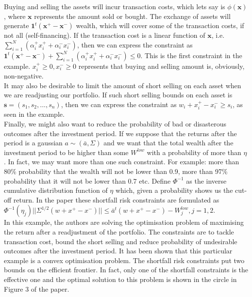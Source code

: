 \documentclass[11pt]{article}
\begin{document}
Buying and selling the assets will incur transaction costs, which lets say is $\phi(\bm{x})$, where $\bm{x}$ represents the amount sold or 
bought. The exchange of assets will generate $\bm{1}^t(\bm{x^+} - \bm{x^-})$ wealth, which will cover some of the transaction costs, if not all 
(self-financing). If the transaction cost is a linear function of $\bm{x}$, i.e. $\sum_{i=1}^N(\alpha_i^+x_i^+ + \alpha_i^-x_i^-)$, then we
can express the constraint as $\bm{1}^t(\bm{x^+} - \bm{x^-}) + \sum_{i=1}^N(\alpha_i^+x_i^+ + \alpha_i^-x_i^-) \leq 0$. This is the first
constraint in the example. $x_i^+ \geq 0, x_i^- \geq 0$ represents that buying and selling amount is, obviously, non-negative.\\

It may also be desirable to limit the amount of short selling on each asset when we are readjusting our portfolio. If such short selling bounds
on each asset is $\bm{s} = (s_1, s_2, ..., s_n)$, then we can express the constraint as $w_i + x_i^+ - x_i^- \geq s_i$, as seen in the example.\\

Finally, we might also want to reduce the probability of bad or disasterous outcomes after the investment period. If we suppose that the returns
after the period is a gaussian $a \sim (\bar{a}, \Sigma)$ and we want that the total wealth after the investment period to be higher
than some $W^{low}$ with a probability of more than $\eta$. In fact, we may want more than one such constraint. For example: more than 80\% probability
that the wealth will not be lower than 0.9, more than 97\% probability that it will not be lower than 0.7 etc. Define $\Phi^{-1}$ as the inverse cumulative distribution function of $\eta$ which, given a probability shows us the cut-off return. In the paper these shortfall risk constraints are formulated as $\Phi^{-1}(\eta_j)||\Sigma^{1/2}(w + x^+ - x^-)|| \leq \bar{a}^t(w + x^+ - x^-) - W^{low}_j, j=1,2$.\\

In this example, the authors are solving the optimisation problem of maximising the return after a readjustment of the portfolio. The constraints
are to tackle transaction cost, bound the short selling and reduce probability of undesirable outcomes after the investment period. It has been shown
that this particular example is a convex optimisation problem. The shortfall risk constraints put two bounds on the efficient frontier. In fact, only
one of the shortfall constraints is the effective one and the optimal solution to this problem is shown in the circle in Figure 3 of the paper.\\
\end{document}
